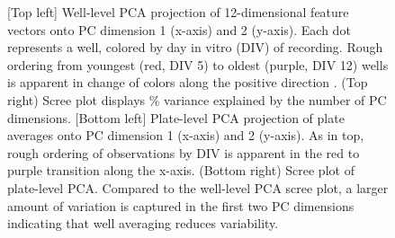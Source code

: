 \documentclass{article}
\begin{document}
\begin{figure}
  \centering
  \caption{[Top left] Well-level PCA projection of 12-dimensional
feature vectors onto PC dimension 1 (x-axis) and 2 (y-axis).  Each dot
represents a well, colored by day in vitro (DIV) of recording. Rough
ordering from youngest (red, DIV 5) to oldest (purple, DIV 12)
wells is apparent in change of colors along the positive direction
. (Top right) Scree plot displays \% variance explained by the number
of PC dimensions. [Bottom left] Plate-level PCA projection of plate
averages onto PC dimension 1 (x-axis) and 2 (y-axis).  As in top,
rough ordering of observations by DIV is apparent in the red to purple
transition along the x-axis. (Bottom right) Scree plot of plate-level
PCA. Compared to the well-level PCA scree plot, a larger amount of
variation is captured in the first two PC dimensions indicating that
well averaging reduces variability.
}
\end{figure}
\end{document}
